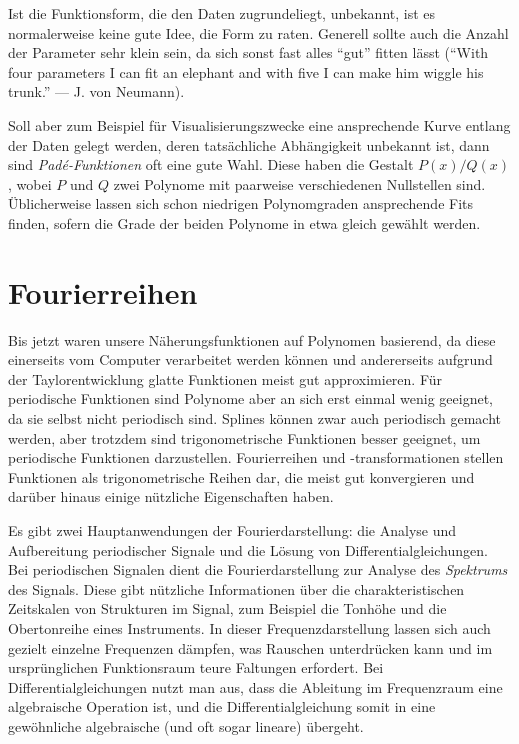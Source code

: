 Ist die Funktionsform, die den Daten zugrundeliegt, unbekannt, ist es
normalerweise keine gute Idee, die Form zu raten. Generell sollte auch
die Anzahl der Parameter sehr klein sein, da sich sonst fast alles
"`gut"' fitten lässt ("`With four parameters I can fit an elephant and
with five I can make him wiggle his trunk."' --- J. von Neumann).

Soll aber zum Beispiel für Visualisierungszwecke eine ansprechende
Kurve entlang der Daten gelegt werden, deren tatsächliche Abhängigkeit
unbekannt ist, dann sind \emph{Pad\'e-Funktionen} oft eine gute
Wahl. Diese haben die Gestalt $P(x)/Q(x)$, wobei $P$ und $Q$ zwei
Polynome mit paarweise verschiedenen Nullstellen sind. Üblicherweise
lassen sich schon niedrigen Polynomgraden ansprechende Fits finden,
sofern die Grade der beiden Polynome in etwa gleich gewählt werden.

\section{Fourierreihen}

Bis jetzt waren unsere Näherungsfunktionen auf Polynomen basierend, da
diese einerseits vom Computer verarbeitet werden können und
andererseits aufgrund der Taylorentwicklung glatte Funktionen meist
gut approximieren. Für periodische Funktionen sind Polynome aber an
sich erst einmal wenig geeignet, da sie selbst nicht periodisch
sind. Splines können zwar auch periodisch gemacht werden, aber
trotzdem sind trigonometrische Funktionen besser geeignet, um
periodische Funktionen darzustellen. Fourierreihen und
-transformationen stellen Funktionen als trigonometrische Reihen dar,
die meist gut konvergieren und darüber hinaus einige nützliche
Eigenschaften haben.

Es gibt zwei Hauptanwendungen der Fourierdarstellung: die Analyse und
Aufbereitung periodischer Signale und die Lösung von
Differentialgleichungen.  Bei periodischen Signalen dient die
Fourierdarstellung zur Analyse des \emph{Spektrums} des Signals.
Diese gibt nützliche Informationen über die charakteristischen
Zeitskalen von Strukturen im Signal, zum Beispiel die Tonhöhe und die
Obertonreihe eines Instruments. In dieser Frequenzdarstellung lassen
sich auch gezielt einzelne Frequenzen dämpfen, was Rauschen
unterdrücken kann und im ursprünglichen Funktionsraum teure Faltungen
erfordert.  Bei Differentialgleichungen nutzt man aus, dass die
Ableitung im Frequenzraum eine algebraische Operation ist, und die
Differentialgleichung somit in eine gewöhnliche algebraische (und oft
sogar lineare) übergeht.

